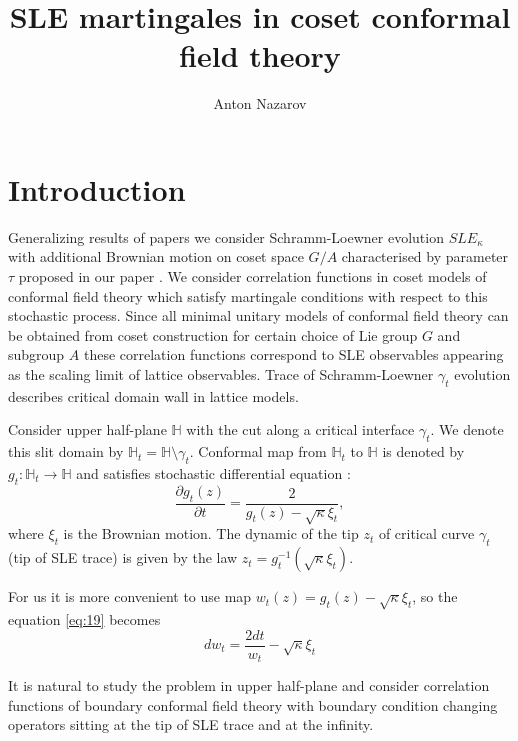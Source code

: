 \documentclass[a4paper]{article}
\theoremstyle{definition}
\theoremstyle{definition} \newtheorem{Def}{Definition}
\begin{document}
\title{SLE martingales in coset conformal field theory}
\author{Anton Nazarov}
\maketitle
\section{Introduction}
\label{sec:introduction}

Generalizing results of papers \cite{bettelheim2005stochastic,santachiara2008sle,alekseev2010sle} we
consider Schramm-Loewner evolution $SLE_{\kappa}$ with additional Brownian motion on coset space
$G/A$ characterised by parameter $\tau$ proposed in our paper \cite{2011arXiv1112.4354N}. We consider correlation functions in coset models of
conformal field theory which satisfy martingale conditions with respect to this stochastic process.
Since all minimal unitary models of conformal field theory can be obtained from coset construction
for certain choice of Lie group $G$ and subgroup $A$ \cite{difrancesco1997cft} these correlation functions correspond to SLE
observables appearing as the scaling limit of lattice observables. Trace of
Schramm-Loewner $\gamma_{t}$ evolution describes critical domain wall in lattice models.

 Consider upper half-plane $\mathbb{H}$ with the cut along a critical interface $\gamma_{t}$. We denote this slit domain by $\mathbb{H}_{t}=\mathbb{H}\setminus \gamma_{t}$. Conformal map from $\mathbb{H}_{t}$ to $\mathbb{H}$ is denoted by $g_{t}:\mathbb{H}_{t}\to \mathbb{H}$ and satisfies stochastic differential equation \cite{schramm2000scaling}:
\begin{equation}
\label{eq:19}
  \frac{\partial g_t(z)}{\partial t} = \frac{ 2}{g_t(z)-\sqrt{\kappa}\xi_{t}} ,
\end{equation}
where $\xi_{t}$ is the Brownian motion. The dynamic of the tip $z_{t}$ of critical curve $\gamma_{t}$ (tip of SLE trace) is given by the law $z_{t}=g_{t}^{-1}(\sqrt{\kappa}\xi_{t})$. 

For us it is more convenient to use map $w_{t} (z)=g_{t}(z)-\sqrt{\kappa}\xi_{t}$, so the equation \eqref{eq:19} becomes
\begin{equation}
  \label{eq:20}
       d w _{t}= \frac{2dt}{w_{t} }-\sqrt{\kappa}\xi_{t}  
\end{equation}

It is natural to study the problem in upper half-plane  and consider correlation
functions of boundary conformal field theory with boundary condition changing operators sitting at
the tip of SLE trace and at the infinity. 
\end{document}

